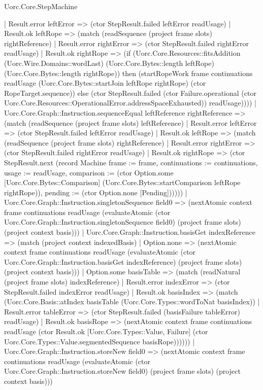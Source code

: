 \begin{lexlean}{Uorc.Core.StepMachine}
\begin{semanticmodule}
{        | Result.error leftError => (ctor StepResult.failed leftError readUsage)
        | Result.ok leftRope => (match (readSequence (project frame slots) rightReference)
          | Result.error rightError => (ctor StepResult.failed rightError readUsage)
          | Result.ok rightRope => (if (Uorc.Core.Resources::fitsAddition (Uorc.Wire.Domains::wordLast) (Uorc.Core.Bytes::length leftRope) (Uorc.Core.Bytes::length rightRope)) then (startRopeWork frame continuations readUsage (Uorc.Core.Bytes::startJoin leftRope rightRope) (ctor RopeTarget.sequence)) else (ctor StepResult.failed (ctor Failure.operational (ctor Uorc.Core.Resources::OperationalError.addressSpaceExhausted)) readUsage))))
      | Uorc.Core.Graph::Instruction.sequenceEqual leftReference rightReference => (match (readSequence (project frame slots) leftReference)
        | Result.error leftError => (ctor StepResult.failed leftError readUsage)
        | Result.ok leftRope => (match (readSequence (project frame slots) rightReference)
          | Result.error rightError => (ctor StepResult.failed rightError readUsage)
          | Result.ok rightRope => (ctor StepResult.next (record Machine {frame := frame, continuations := continuations, usage := readUsage, comparison := (ctor Option.some [Uorc.Core.Bytes::Comparison] (Uorc.Core.Bytes::startComparison leftRope rightRope)), pending := (ctor Option.none [Pending])}))))
      | Uorc.Core.Graph::Instruction.singletonSequence field0 => (nextAtomic context frame continuations readUsage (evaluateAtomic (ctor Uorc.Core.Graph::Instruction.singletonSequence field0) (project frame slots) (project context basis)))
      | Uorc.Core.Graph::Instruction.basisGet indexReference => (match (project context indexedBasis)
        | Option.none => (nextAtomic context frame continuations readUsage (evaluateAtomic (ctor Uorc.Core.Graph::Instruction.basisGet indexReference) (project frame slots) (project context basis)))
        | Option.some basisTable => (match (readNatural (project frame slots) indexReference)
          | Result.error indexError => (ctor StepResult.failed indexError readUsage)
          | Result.ok basisIndex => (match (Uorc.Core.Basis::atIndex basisTable (Uorc.Core.Types::wordToNat basisIndex))
            | Result.error tableError => (ctor StepResult.failed (basisFailure tableError) readUsage)
            | Result.ok basisRope => (nextAtomic context frame continuations readUsage (ctor Result.ok [Uorc.Core.Types::Value, Failure] (ctor Uorc.Core.Types::Value.segmentedSequence basisRope))))))
      | Uorc.Core.Graph::Instruction.storeNew field0 => (nextAtomic context frame continuations readUsage (evaluateAtomic (ctor Uorc.Core.Graph::Instruction.storeNew field0) (project frame slots) (project context basis)))
}
\end{semanticmodule}
\end{lexlean}

